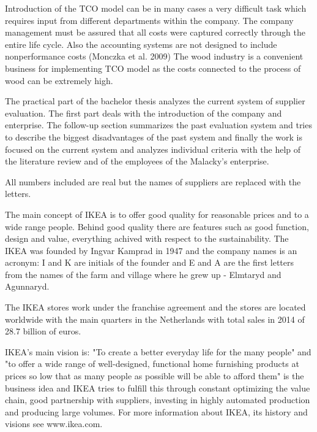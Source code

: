 \documentclass[oneside,12pt]{article}%
\begin{document}
Introduction of the TCO model can be in many cases a very difficult task which requires input from different departments within the company. The company management must be assured that all costs were captured correctly through the entire life cycle. Also the accounting systems are not designed to include nonperformance costs (Monczka et al. 2009) The wood industry is a convenient business for implementing TCO model as the costs connected to the process of wood can be extremely high.





The practical part of the bachelor thesis analyzes the current system of supplier evaluation. The first part deals with the introduction of the company and enterprise. The follow-up section summarizes the past evaluation system and tries to describe the biggest disadvantages of the past system and finally the work is focused on the current system and analyzes individual criteria with the help of the literature review and of the employees of the Malacky’s enterprise. \par
All numbers included are real but the names of suppliers are replaced with the letters.

The main concept of IKEA is to offer good quality for reasonable prices and to a wide range people. Behind good quality there are features such as good function, design and value, everything achived with respect to the sustainability. The IKEA was founded by Ingvar Kamprad in 1947 and the company names is an acronym: I and K are initials of the founder and E and A are the first letters from the names of the farm and village where he grew up - Elmtaryd and Agunnaryd. \par
The IKEA stores work under the franchise agreement and the stores are located worldwide with the main quarters in the Netherlands with total sales in 2014 of 28.7 billion of euros. \par
IKEA’s main vision is: "To create a better everyday life for the many people" and "to offer a wide range of well-designed, functional home furnishing products at prices so low that as many people as possible will be able to afford them" is the business idea and IKEA tries to fulfill this through constant optimizing the value chain, good partnership with suppliers, investing in highly automated production and producing large volumes. For more information about IKEA, its history and visions see www.ikea.com.
\end{document}
